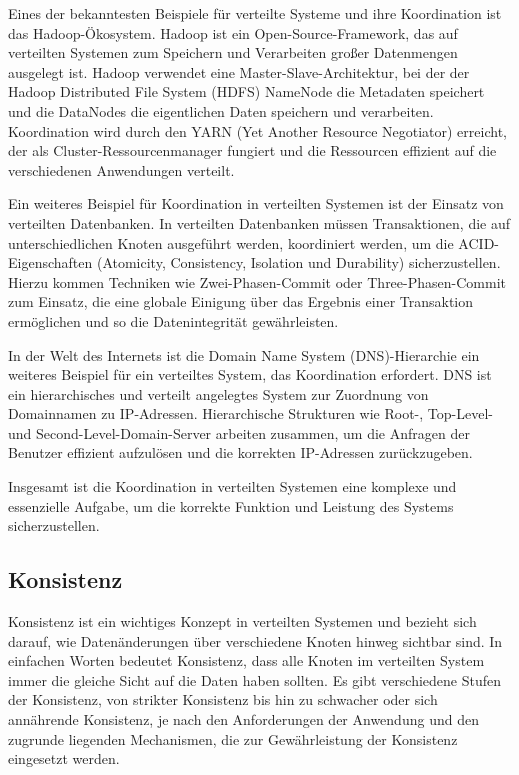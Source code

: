 Eines der bekanntesten Beispiele für verteilte Systeme und ihre Koordination ist das Hadoop-Ökosystem. Hadoop ist ein Open-Source-Framework, das auf verteilten Systemen zum Speichern und Verarbeiten großer Datenmengen ausgelegt ist. Hadoop verwendet eine Master-Slave-Architektur, bei der der Hadoop Distributed File System (HDFS) NameNode die Metadaten speichert und die DataNodes die eigentlichen Daten speichern und verarbeiten. Koordination wird durch den YARN (Yet Another Resource Negotiator) erreicht, der als Cluster-Ressourcenmanager fungiert und die Ressourcen effizient auf die verschiedenen Anwendungen verteilt.

Ein weiteres Beispiel für Koordination in verteilten Systemen ist der Einsatz von verteilten Datenbanken. In verteilten Datenbanken müssen Transaktionen, die auf unterschiedlichen Knoten ausgeführt werden, koordiniert werden, um die ACID-Eigenschaften (Atomicity, Consistency, Isolation und Durability) sicherzustellen. Hierzu kommen Techniken wie Zwei-Phasen-Commit oder Three-Phasen-Commit zum Einsatz, die eine globale Einigung über das Ergebnis einer Transaktion ermöglichen und so die Datenintegrität gewährleisten.

In der Welt des Internets ist die Domain Name System (DNS)-Hierarchie ein weiteres Beispiel für ein verteiltes System, das Koordination erfordert. DNS ist ein hierarchisches und verteilt angelegtes System zur Zuordnung von Domainnamen zu IP-Adressen. Hierarchische Strukturen wie Root-, Top-Level- und Second-Level-Domain-Server arbeiten zusammen, um die Anfragen der Benutzer effizient aufzulösen und die korrekten IP-Adressen zurückzugeben.

Insgesamt ist die Koordination in verteilten Systemen eine komplexe und essenzielle Aufgabe, um die korrekte Funktion und Leistung des Systems sicherzustellen. 

\subsection{Konsistenz}

Konsistenz ist ein wichtiges Konzept in verteilten Systemen und bezieht sich darauf, wie Datenänderungen über verschiedene Knoten hinweg sichtbar sind. In einfachen Worten bedeutet Konsistenz, dass alle Knoten im verteilten System immer die gleiche Sicht auf die Daten haben sollten. Es gibt verschiedene Stufen der Konsistenz, von strikter Konsistenz bis hin zu schwacher oder sich annährende Konsistenz, je nach den Anforderungen der Anwendung und den zugrunde liegenden Mechanismen, die zur Gewährleistung der Konsistenz eingesetzt werden.


